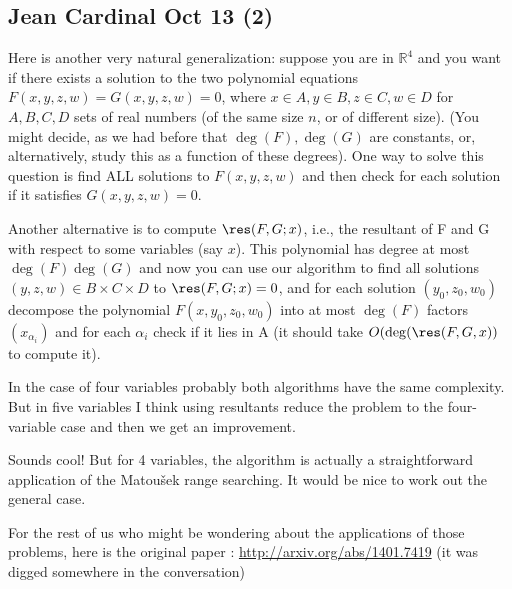 \subsection{Jean Cardinal Oct 13 (2)}
\begin{displayquote}
	Here is another very natural generalization: suppose you are in $\mathbb{R}^4$
and you want if there exists a solution to the two polynomial equations
$F(x,y,z,w)=G(x,y,z,w)=0$, where $x \in A, y\in B, z\in C, w \in D$ for $A,B,C,D$
sets of real numbers (of the same size $n$, or of different size).
(You might decide, as we had before that $\deg(F), \deg(G)$ are constants,
or, alternatively, study this as a function of these degrees).
One way to solve this question is find ALL solutions to $F(x,y,z,w)$ and then
check for each solution if it satisfies $G(x,y,z,w)=0$.

Another alternative is to compute $\res(F,G; x)$, i.e., the resultant of F and
G with respect to some variables (say $x$). This polynomial has degree at
most $\deg(F)\deg(G)$ and now you can use our algorithm to find all solutions
$(y,z,w) \in B\times C \times D$ to $\res(F,G;x)=0$, and for each solution $(y_0,
z_0, w_0)$ decompose the polynomial $F(x,y_0,z_0,w_0)$ into at most $\deg(F)$
factors $(x_{\alpha_i})$ and for each $\alpha_i$  check if it lies in A (it
should take $O(\deg(\res(F,G,x))$ to compute it).

In the case of four variables probably both algorithms have the same
complexity. But in five variables I think using resultants reduce the
problem to the four-variable case and then we get an improvement.
\end{displayquote}

Sounds cool!
But for 4 variables, the algorithm is actually a straightforward
application of the Matou\v{s}ek range searching.
It would be nice to work out the general case.

For the rest of us who might be wondering about the applications of those
problems, here is the original paper :
\url{http://arxiv.org/abs/1401.7419}
(it was digged somewhere in the conversation)

